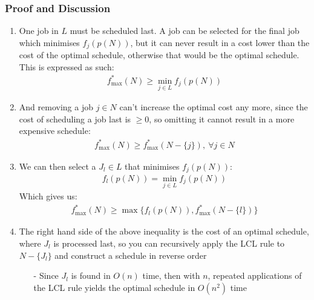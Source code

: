 \documentclass[fleqn]{article}
\begin{document}
  \subsubsection*{Proof and Discussion}
  \begin{enumerate}
    \item One job in $L$ must be scheduled last. A job can be
    selected for the final job which minimises $f_j(p(N))$, but it can never result in a cost lower than the cost of the optimal schedule, otherwise that would be the optimal schedule. This is expressed as such: \begin{align*}
      f^*_{\text{max}}(N) \ge \min_{j \in L}f_j (p(N))
    \end{align*}
    \item And removing a job $j \in N$ can't increase the optimal cost any more, since the cost of scheduling a job last is $\ge 0$, so omitting it cannot result in a more expensive schedule: \begin{align*}
      f^*_{\text{max}}(N) \ge f^*_{\text{max}}(N - \{ j \}), \ \forall j \in N
    \end{align*}
    \item We can then select a $J_l \in L$ that minimises $f_j(p(N))$: \begin{align*}
      f_l(p(N)) = \min_{j \in L}f_j(p(N))
    \end{align*}
    Which gives us: \begin{align*}
      f^*_{\text{max}}(N) \ge \max \{ f_l(p(N)), f_{\text{max}}^*(N - \{ l \}) \}
    \end{align*}
    \item The right hand side of the above inequality is the cost of an optimal schedule, where $J_l$ is processed last,
    so you can recursively apply the LCL rule to $N - \{ J_l \}$ and construct a schedule in reverse order
    \begin{itemize}
      \item[-] Since $J_l$ is found in $O(n)$ time, then with $n$, repeated applications of the LCL rule yields the optimal schedule in $O(n^2)$ time
    \end{itemize}
  \end{enumerate}
\end{document}

